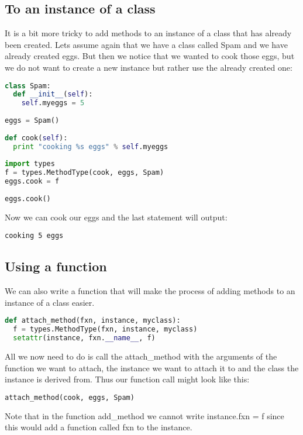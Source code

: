 \subsection{To an instance of a class}
It is a bit more tricky to add methods to an instance of a class that has
already been created. Lets assume again that we have a class called Spam and we
have already created eggs. But then we notice that we wanted to cook those eggs,
but we do not want to create a new instance but rather use the already created
one:
\lstset{basicstyle=\scriptsize, numbers=left, captionpos=b, tabsize=4}
\begin{lstlisting}[caption=Add function to Class,language={Python},
xleftmargin=15pt, label=lst:addfunctiontoclass]
class Spam:
  def __init__(self):
    self.myeggs = 5
 
eggs = Spam()
 
def cook(self):
  print "cooking %s eggs" % self.myeggs
 
import types
f = types.MethodType(cook, eggs, Spam)
eggs.cook = f
 
eggs.cook()
\end{lstlisting}

Now we can cook our eggs and the last statement will output:
\scriptsize
\begin{verbatim}
cooking 5 eggs
\end{verbatim}
\normalsize

\subsection{Using a function}
We can also write a function that will make the process of adding methods to an
instance of a class easier.
\lstset{basicstyle=\scriptsize, numbers=left, captionpos=b, tabsize=4}
\begin{lstlisting}[caption=Adding Member Reflection,language={Python},
xleftmargin=15pt, label=lst:addingmemberreflection]
def attach_method(fxn, instance, myclass):
  f = types.MethodType(fxn, instance, myclass)
  setattr(instance, fxn.__name__, f)
\end{lstlisting}

All we now need to do is call the attach\_method with the arguments of the
function we want to attach, the instance we want to attach it to and the class
the instance is derived from. Thus our function call might look like this:
\lstset{basicstyle=\scriptsize, numbers=left, captionpos=b, tabsize=4}
\begin{lstlisting}[caption=Adding Member Usage,language={Python},
xleftmargin=15pt, label=lst:addingmemberusage]
attach_method(cook, eggs, Spam)
\end{lstlisting}
Note that in the function add\_method we cannot write instance.fxn = f since this
would add a function called fxn to the instance.
